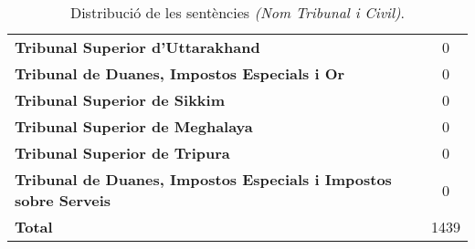 \begin{table}[H]
\begin{tabular}{l|c}
    \textbf{Tribunal Superior d'Uttarakhand} & 0 \\
    \textbf{Tribunal de Duanes, Impostos Especials i Or} & 0 \\
    \textbf{Tribunal Superior de Sikkim} & 0 \\
    \textbf{Tribunal Superior de Meghalaya} & 0 \\
    \textbf{Tribunal Superior de Tripura} & 0 \\
    \textbf{Tribunal de Duanes, Impostos Especials i Impostos sobre Serveis} & 0 \\
    \textbf{Total} & 1439 \\
    \bottomrule
   \end{tabular}
   \captionsetup{font=small}
   \caption*{Distribució de les sentències \textit{(Nom Tribunal i Civil)}.}
\end{table}

\pagebreak
  
